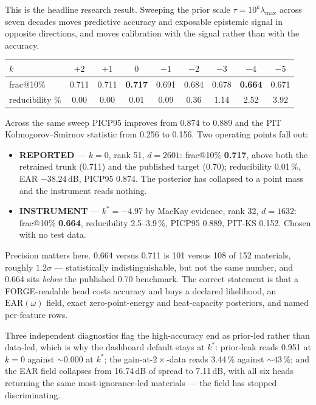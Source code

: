 \documentclass[11pt]{article}
\begin{document}
This is the headline research result. Sweeping the prior scale
$\tau=10^{k}\lambda_{\max}$ across seven decades moves predictive accuracy and
exposable epistemic signal in opposite directions, and moves calibration with
the signal rather than with the accuracy.

\begin{center}\boardfont
\begin{tabular}{|l|c|c|c|c|c|c|c|c|}
\hline
\textbf{$k$} & $+2$ & $+1$ & $0$ & $-1$ & $-2$ & $-3$ & $-4$ & $-5$ \\ \hline
frac@10\% & 0.711 & 0.711 & \textbf{0.717} & 0.691 & 0.684 & 0.678 & \textbf{0.664} & 0.671 \\ \hline
reducibility \% & 0.00 & 0.00 & 0.01 & 0.09 & 0.36 & 1.14 & 2.52 & 3.92 \\ \hline
\end{tabular}
\end{center}

\noindent Across the same sweep PICP95 improves from 0.874 to 0.889 and the PIT
Kolmogorov--Smirnov statistic from 0.256 to 0.156. Two operating points fall
out:

\begin{itemize}[leftmargin=1.4em]\setlength{\itemsep}{2pt}
  \item \textbf{REPORTED} --- $k=0$, rank 51, $d=2601$: frac@10\% \textbf{0.717},
        above both the retrained trunk (0.711) and the published target (0.70);
        reducibility 0.01\,\%, EAR $-38.24$\,dB, PICP95 0.874. The posterior has
        collapsed to a point mass and the instrument reads nothing.
  \item \textbf{INSTRUMENT} --- $k^*=-4.97$ by MacKay evidence, rank 32,
        $d=1632$: frac@10\% \textbf{0.664}, reducibility 2.5--3.9\,\%,
        PICP95 0.889, PIT-KS 0.152. Chosen with no test data.
\end{itemize}

Precision matters here. 0.664 versus 0.711 is 101 versus 108 of 152 materials,
roughly $1.2\sigma$ --- statistically indistinguishable, but not the same number,
and 0.664 sits \emph{below} the published 0.70 benchmark. The correct statement
is that a FORGE-readable head costs accuracy and buys a declared likelihood, an
$\mathrm{EAR}(\omega)$ field, exact zero-point-energy and heat-capacity
posteriors, and named per-feature rows.

Three independent diagnostics flag the high-accuracy end as prior-led rather
than data-led, which is why the dashboard default stays at $k^*$: prior-leak
reads 0.951 at $k=0$ against $\sim\!0.000$ at $k^*$; the gain-at-$2\times$-data
reads 3.44\,\% against $\sim\!43$\,\%; and the EAR field collapses from
16.74\,dB of spread to 7.11\,dB, with all six heads returning the same
most-ignorance-led materials --- the field has stopped discriminating.
\end{document}
